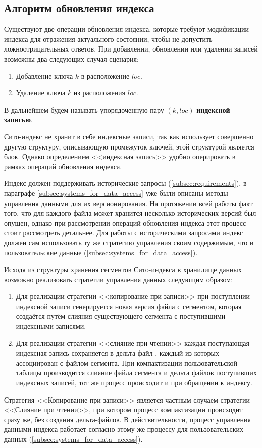 \subsection{Алгоритм обновления индекса}

Существуют две операции обновления индекса, которые требуют модификации индекса для отражения актуального состоянии, чтобы не допустить ложноотрицательных ответов. При добавлении, обновлении или удалении записей возможны два следующих случая сценария: 
\begin{enumerate}
    \item Добавление ключа $k$ в расположение $loc$.
    \item Удаление ключа $k$ из расположения $loc$.
\end{enumerate}

В дальнейшем будем называть упорядоченную пару $(k, loc)$ \textbf{индексной записью}.

Сито-индекс не хранит в себе индексные записи, так как использует совершенно другую структуру, описывающую промежуток ключей, этой структурой является блок. Однако определением {<<индексная запись>>} удобно оперировать в рамках операций обновления индекса.

Индекс должен поддерживать исторические запросы (\ref{subsec:requirements}), в параграфе \ref{subsec:systems_for_data_access} уже были описаны методы управления данными для их версионирования. На протяжении всей работы факт того, что для каждого файла может хранится несколько исторических версий был опущен, однако при рассмотрении операций обновления индекса этот процесс стоит рассмотреть детальнее. Для работы с историческими запросами индекс должен сам использовать ту же стратегию управления своим содержимым, что и пользовательские данные (\ref{subsec:systems_for_data_access}).

Исходя из структуры хранения сегментов Сито-индекса в хранилище данных возможно реализовать стратегии управления данных следующим образом:
\begin{enumerate}
    \item Для реализации стратегии {<<копирование при записи>>} при поступлении индексной записи генерируется новая версия файла с сегментом, которая создаётся путём слияния существующего сегмента с поступившими индексными записями.
    \item Для реализации стратегии {<<слияние при чтении>>} каждая поступающая индексная запись сохраняется в дельта-файл , каждый из которых ассоциирован с файлом сегмента. При компактизации пользовательской таблицы производится слияние файла сегмента и дельта файлов поступивших индексных записей, тот же процесс происходит и при обращении к индексу.
\end{enumerate}
Стратегия {<<Копирование при записи>>} является частным случаем стратегии {<<Слияние при чтении>>}, при котором процесс компактизации происходит сразу же, без создания дельта-файлов. В действительности, процесс управления данными индекса работает согласно этому же процессу для пользовательских данных (\ref{subsec:systems_for_data_access}).

